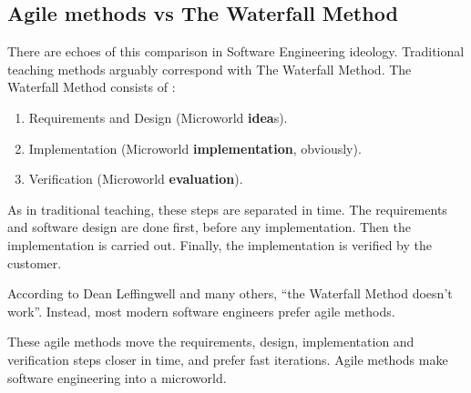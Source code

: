 \subsection{Agile methods vs The Waterfall Method}

There are echoes of this comparison in Software Engineering ideology.
Traditional teaching methods arguably correspond with The Waterfall
Method. The Waterfall Method consists of \cite{wiki:waterfall}: 

\begin{enumerate}
\item Requirements and Design (Microworld \textbf{idea}s). 
\item Implementation (Microworld \textbf{implementation}, obviously). 
\item Verification (Microworld \textbf{evaluation}).
\end{enumerate}

As in traditional teaching, these steps are separated in time. The
requirements and software design are done first, before any
implementation. Then the implementation is carried out. Finally, the
implementation is verified by the customer.

According to Dean Leffingwell and many others, ``the Waterfall Method
doesn't work''\cite{leffingwell}. Instead, most modern software engineers
prefer agile methods.

These agile methods move the requirements, design, implementation and
verification steps closer in time, and prefer fast iterations. Agile
methods make software engineering into a microworld.

